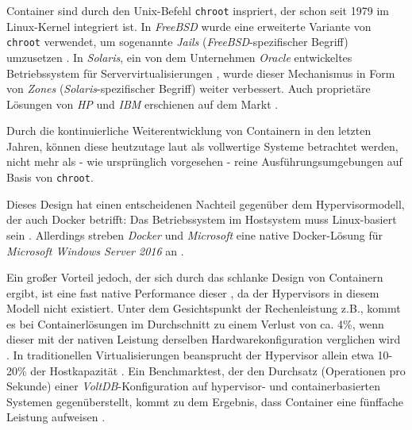 \documentclass[../main.tex]{subfiles}
\begin{document}
      Container sind durch den Unix-Befehl \texttt{\acrshort{chroot}} inspriert, der schon seit 1979 im Linux-Kernel integriert ist. In \emph{FreeBSD} wurde eine erweiterte Variante von \texttt{chroot} verwendet, um sogenannte \emph{Jails} (\emph{FreeBSD}-spezifischer Begriff) umzusetzen \cite{jails}. In \emph{Solaris}, ein von dem Unternehmen \emph{Oracle} entwickeltes Betriebssystem für Servervirtualisierungen \cite{solaris}, wurde dieser Mechanismus in Form von \emph{Zones} (\emph{Solaris}-spezifischer Begriff) \cite{zones} weiter verbessert. Auch proprietäre Lösungen von \emph{HP} und \emph{IBM} erschienen auf dem Markt \cite[S.2]{dockerLXCKub}.

			Durch die kontinuierliche Weiterentwicklung von Containern in den letzten Jahren, können diese heutzutage laut \cite[S.7]{dockerBook} als vollwertige Systeme betrachtet werden, nicht mehr als - wie ursprünglich vorgesehen - reine Ausführungsumgebungen auf Basis von \texttt{chroot}.

			Dieses Design hat einen entscheidenen Nachteil gegenüber dem Hypervisormodell, der auch Docker betrifft: Das Betriebssystem im Hostsystem muss Linux-basiert sein \cite[S.6]{dockerBook}. Allerdings streben \emph{Docker} und \emph{Microsoft} eine native Docker-Lösung für \emph{Microsoft Windows Server 2016} an \cite{dockerWindowsSupport}.

			Ein großer Vorteil jedoch, der sich durch das schlanke Design von Containern ergibt, ist eine fast native Performance dieser \cite[S.1]{containerVirtPerformance}, da der Hypervisors in diesem Modell nicht existiert. Unter dem Gesichtspunkt der Rechenleistung z.B., kommt es bei Containerlösungen im Durchschnitt zu einem Verlust von ca. 4\%, wenn dieser mit der nativen Leistung derselben Hardwarekonfiguration verglichen wird \cite[S.4]{containerVirtPerformance}\cite[S.5]{IBMcontVMcomparison}. In traditionellen Virtualisierungen beansprucht der Hypervisor allein etwa 10-20\% der Hostkapazität \cite[S.2]{dockerIntroIEEE}\cite[S.5]{IBMcontVMcomparison}. Ein Benchmarktest, der den Durchsatz (Operationen pro Sekunde) einer \emph{VoltDB}-Konfiguration \cite{voltdb} auf hypervisor- und containerbasierten Systemen gegenüberstellt, kommt zu dem Ergebnis, dass Container eine fünffache Leistung aufweisen \cite[S.2f.]{voltdbBenchmark}.
\end{document}
